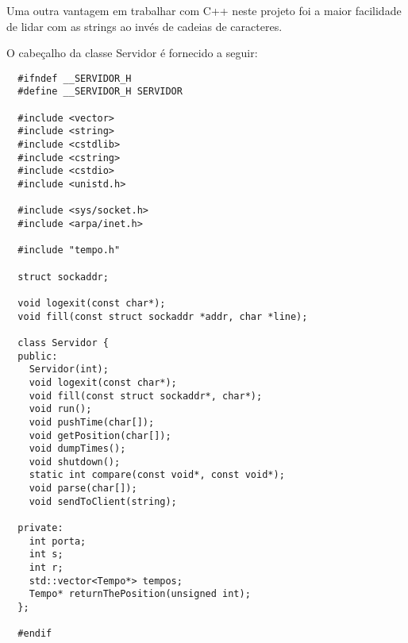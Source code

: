 \documentclass[12pt]{article}
\begin{document}
Uma outra vantagem em trabalhar com C++ neste projeto foi a maior facilidade de
lidar com as strings ao invés de cadeias de caracteres.

O cabeçalho da classe Servidor é fornecido a seguir:

\begin{verbatim}
  #ifndef __SERVIDOR_H
  #define __SERVIDOR_H SERVIDOR

  #include <vector>
  #include <string>
  #include <cstdlib>
  #include <cstring>
  #include <cstdio>
  #include <unistd.h>

  #include <sys/socket.h>
  #include <arpa/inet.h>

  #include "tempo.h"

  struct sockaddr;

  void logexit(const char*);
  void fill(const struct sockaddr *addr, char *line);

  class Servidor {
  public:
    Servidor(int);
    void logexit(const char*);
    void fill(const struct sockaddr*, char*);
    void run();
    void pushTime(char[]);
    void getPosition(char[]);
    void dumpTimes();
    void shutdown();
    static int compare(const void*, const void*);
    void parse(char[]);
    void sendToClient(string);

  private:
    int porta;
    int s;
    int r;
    std::vector<Tempo*> tempos;
    Tempo* returnThePosition(unsigned int);
  };

  #endif
\end{verbatim}
\end{document}
